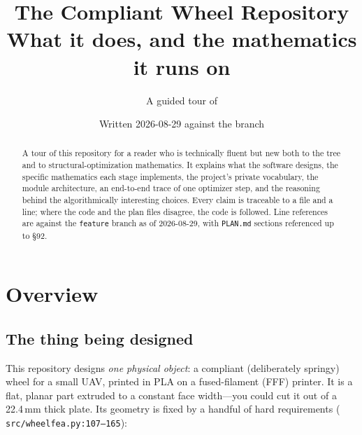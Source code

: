 \documentclass[11pt,a4paper]{article}
\title{\textbf{The Compliant Wheel Repository}\\[0.35em]
       \large What it does, and the mathematics it runs on}
\author{A guided tour of \code{github/wheel}}
\date{Written 2026-08-29 against the \code{feature} branch}
\DeclareRobustCommand{\code}[1]{%
  \texttt{\small\def\_{\textunderscore\discretionary{}{}{}}#1}}
\newcommand{\at}[2]{\code{#1:#2}}
\begin{document}
\maketitle

\begin{abstract}
\noindent
A tour of this repository for a reader who is technically fluent but new both to the
tree and to structural-optimization mathematics. It explains what the software
designs, the specific mathematics each stage implements, the project's private
vocabulary, the module architecture, an end-to-end trace of one optimizer step, and
the reasoning behind the algorithmically interesting choices. Every claim is traceable
to a file and a line; where the code and the plan files disagree, the code is followed.
Line references are against the \code{feature} branch as of 2026-08-29, with
\code{PLAN.md} sections referenced up to \S92.
\end{abstract}

\tableofcontents
\clearpage

\section{Overview}
\label{sec:overview}

\subsection{The thing being designed}

This repository designs \emph{one physical object}: a compliant (deliberately springy)
wheel for a small UAV, printed in PLA on a fused-filament (FFF) printer. It is a flat,
planar part extruded to a constant face width---you could cut it out of a 22.4\,mm
thick plate. Its geometry is fixed by a handful of hard requirements
(\at{src/wheel\_fea.py}{107--165}):
\end{document}
